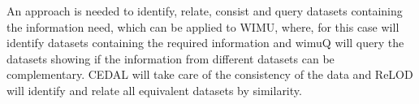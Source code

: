 An approach is needed to identify, relate, consist and query datasets containing the information need, which can be applied to WIMU\cite{valdestilhas2018my}, where, for this case will identify datasets containing the required information and wimuQ\cite{ValdestilhasKcap} will query the datasets showing if the information from different datasets can be complementary. CEDAL\cite{valdestilhas2017cedal} will take care of the consistency of the data and ReLOD\cite{valdestilhasSWJ2020} will identify and relate all equivalent datasets by similarity.

